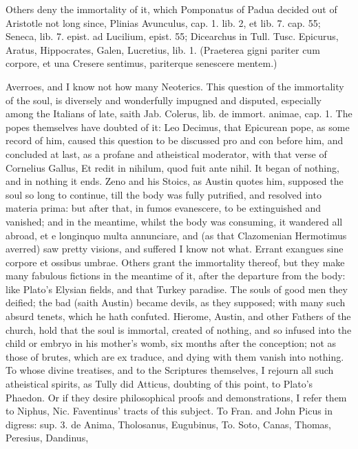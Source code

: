 {Others deny the immortality of it, which Pomponatus of Padua decided
out of Aristotle not long since, Plinias Avunculus, cap. 1. lib. 2, et
lib. 7. cap. 55; Seneca, lib. 7. epist. ad Lucilium, epist. 55;
Dicearchus in Tull. Tusc. Epicurus, Aratus, Hippocrates, Galen,
Lucretius, lib. 1.
(Praeterea gigni pariter cum corpore, et una
Cresere sentimus, pariterque senescere mentem.)

Averroes, and I know not how many Neoterics. This question of the
immortality of the soul, is diversely and wonderfully impugned and
disputed, especially among the Italians of late, saith Jab. Colerus,
lib. de immort. animae, cap. 1. The popes themselves have doubted of
it: Leo Decimus, that Epicurean pope, as some record of him,
caused this question to be discussed pro and con before him, and
concluded at last, as a profane and atheistical moderator, with that
verse of Cornelius Gallus, Et redit in nihilum, quod fuit ante nihil.
It began of nothing, and in nothing it ends. Zeno and his Stoics, as
Austin quotes him, supposed the soul so long to continue, till
the body was fully putrified, and resolved into materia prima: but
after that, in fumos evanescere, to be extinguished and vanished; and
in the meantime, whilst the body was consuming, it wandered all abroad,
et e longinquo multa annunciare, and (as that Clazomenian Hermotimus
averred) saw pretty visions, and suffered I know not what. Errant
exangues sine corpore et ossibus umbrae.
Others grant the immortality thereof, but they make many fabulous
fictions in the meantime of it, after the departure from the body: like
Plato's Elysian fields, and that Turkey paradise. The souls of good men
they deified; the bad (saith Austin) became devils, as they
supposed; with many such absurd tenets, which he hath confuted.
Hierome, Austin, and other Fathers of the church, hold that the soul is
immortal, created of nothing, and so infused into the child or embryo
in his mother's womb, six months after the conception; not as
those of brutes, which are ex traduce, and dying with them vanish into
nothing. To whose divine treatises, and to the Scriptures themselves, I
rejourn all such atheistical spirits, as Tully did Atticus, doubting of
this point, to Plato's Phaedon. Or if they desire philosophical proofs
and demonstrations, I refer them to Niphus, Nic. Faventinus' tracts of
this subject. To Fran. and John Picus in digress: sup. 3. de Anima,
Tholosanus, Eugubinus, To. Soto, Canas, Thomas, Peresius, Dandinus,
}
